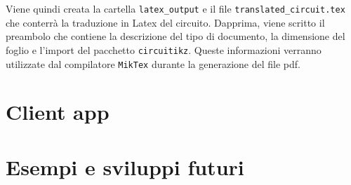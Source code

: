 \noindent
Viene quindi creata la cartella \texttt{latex\_output} e il file \texttt{translated\_circuit.tex} che conterrà la traduzione in Latex del circuito. Dapprima, viene scritto il preambolo che contiene la descrizione del tipo di documento, la dimensione del foglio e l'import del pacchetto \texttt{circuitikz}. Queste informazioni verranno utilizzate dal compilatore \texttt{MikTex} durante la generazione del file pdf.


\section{Client app}

\section{Esempi e sviluppi futuri}